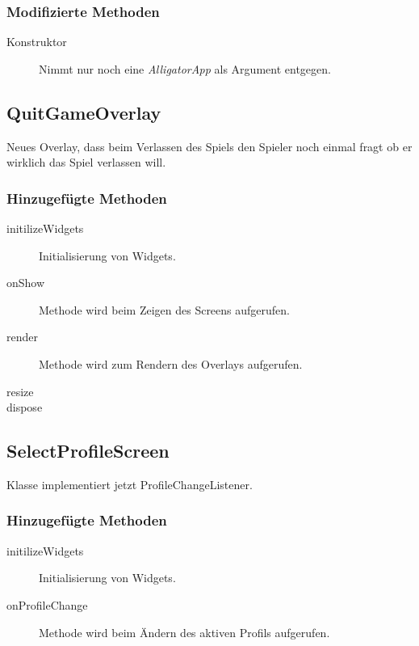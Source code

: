 \subsubsection{Modifizierte Methoden}
\begin{description}
\item[Konstruktor]
Nimmt nur noch eine \emph{AlligatorApp} als Argument entgegen.

\end{description}




\subsection{QuitGameOverlay}
Neues Overlay, dass beim Verlassen des Spiels den Spieler noch einmal fragt ob er wirklich das Spiel verlassen will.

\subsubsection{Hinzugefügte Methoden}
\begin{description}
\item[initilizeWidgets]
Initialisierung von Widgets.
\item[onShow]
Methode wird beim Zeigen des Screens aufgerufen.
\item[render]
Methode wird zum Rendern des Overlays aufgerufen.
\item[resize]
\item[dispose]
\end{description}


\subsection{SelectProfileScreen}
Klasse implementiert jetzt ProfileChangeListener.
\subsubsection{Hinzugefügte Methoden}
\begin{description}
\item[initilizeWidgets]
Initialisierung von Widgets.
\item[onProfileChange]
Methode wird beim Ändern des aktiven Profils aufgerufen.

\end{description}

